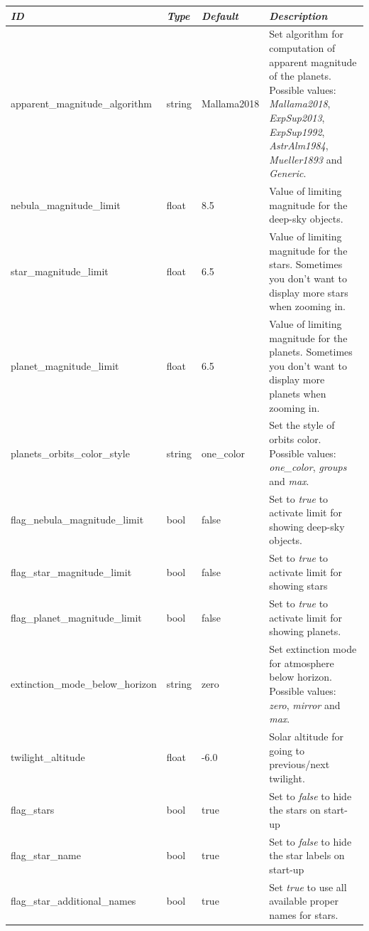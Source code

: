 \begin{longtable}{l|l|l|p{55mm}}
\toprule
\emph{ID} & \emph{Type} & \emph{Default} & \emph{Description}\\\midrule
apparent\_magnitude\_algorithm     & string & Mallama2018 & Set algorithm for computation of apparent magnitude of the planets. 
                                                   Possible values: \emph{Mallama2018}, \emph{ExpSup2013}, \emph{ExpSup1992}, \emph{AstrAlm1984}, \emph{Mueller1893} and \emph{Generic}.\\%
nebula\_magnitude\_limit           & float  & 8.5  & Value of limiting magnitude for the deep-sky objects.\\%
star\_magnitude\_limit             & float  & 6.5  & Value of limiting magnitude for the stars. Sometimes you don't want to display more stars when zooming in. \\%
planet\_magnitude\_limit           & float  & 6.5  & Value of limiting magnitude for the planets. Sometimes you don't want to display more planets when zooming in. \\%
planets\_orbits\_color\_style      & string & one\_color & Set the style of orbits color. Possible values: \emph{one\_color}, \emph{groups} and \emph{max}.\\%
flag\_nebula\_magnitude\_limit     & bool   & false & Set to \emph{true} to activate limit for showing deep-sky objects.\\%
flag\_star\_magnitude\_limit       & bool   & false & Set to \emph{true} to activate limit for showing stars\\%
flag\_planet\_magnitude\_limit     & bool   & false & Set to \emph{true} to activate limit for showing planets.\\\midrule
extinction\_mode\_below\_horizon   & string & zero & Set extinction mode for atmosphere below horizon. Possible values: \emph{zero}, \emph{mirror} and \emph{max}.\\
twilight\_altitude                 & float  & -6.0 & Solar altitude for going to previous/next twilight.\\\midrule
%
flag\_stars                        & bool   & true  & Set to \emph{false} to hide the stars on start-up\\
flag\_star\_name                   & bool   & true  & Set to \emph{false} to hide the star labels on start-up\\
flag\_star\_additional\_names      & bool   & true  & Set \emph{true} to use all available proper names for stars.\\\midrule

\end{longtable}
